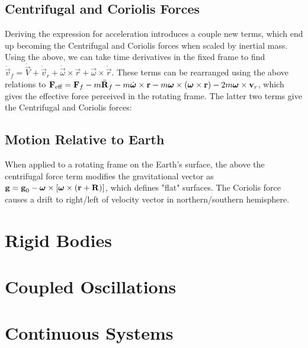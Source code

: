 \subsection{Centrifugal and Coriolis Forces}
Deriving the expression for acceleration introduces a couple new terms, which end up becoming the Centrifugal and Coriolis forces when scaled by inertial mass.  Using the above, we can take time derivatives in the fixed frame to find $\dot{\vec{v}}_f = \dot{\vec{V}} + \dot{\vec{v}}_r + \dot{\vec{\omega}}\times\vec{r} + \vec{\omega}\times\dot{\vec{r}}$. These terms can be rearranged using the above relations to $\boldsymbol{\mathbf{F}}_{\text{eff}} = \boldsymbol{\mathbf{F}}_f - m\ddot{\boldsymbol{\mathbf{R}}}_f - m\dot{\boldsymbol{\mathbf{\omega}}}\times\boldsymbol{\mathbf{r}} - m\boldsymbol{\mathbf{\omega}}\times\left(\boldsymbol{\mathbf{\omega}}\times\boldsymbol{\mathbf{r}}\right) - 2m\boldsymbol{\mathbf{\omega}}\times\boldsymbol{\mathbf{v}}_r$, which gives the effective force perceived in the rotating frame. The latter two terms give the Centrifugal and Coriolis forces:
\subsection{Motion Relative to Earth}
When applied to a rotating frame on the Earth's surface, the above the centrifugal force term modifies the gravitational vector as $\boldsymbol{\mathbf{g}} = \boldsymbol{\mathbf{g}}_0 - \boldsymbol{\mathbf{\omega}}\times\left[\boldsymbol{\mathbf{\omega}}\times\left(\boldsymbol{\mathbf{r}}+\boldsymbol{\mathbf{R}}\right)\right]$, which defines "flat" surfaces. The Coriolis force causes a drift to right/left of velocity vector in northern/southern hemisphere.



\newpage
\section{Rigid Bodies}
\label{sec:cm-rigid}


\newpage
\section{Coupled Oscillations}
\label{sec:cm-coupled}

 


\newpage
\section{Continuous Systems}
\label{sec:cm-continuous}




